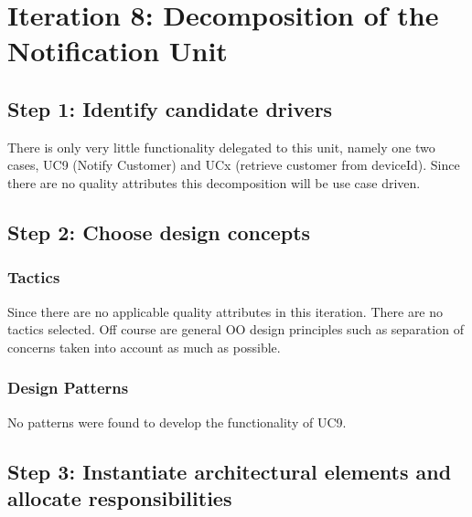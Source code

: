 \section{Iteration 8: Decomposition of the Notification Unit}
\label{add:it8}

\subsection{Step 1: Identify candidate drivers}
\label{add:it8/drivers}

\npar There is only very little functionality delegated to this unit, namely one
two cases, UC9 (Notify Customer) and UCx (retrieve customer from deviceId).
Since there are no quality attributes this decomposition will be use case
driven.

\subsection{Step 2: Choose design concepts}
\label{add:it8/concepts}

\subsubsection{Tactics}
\label{add:it8/tactics}

\npar Since there are no applicable quality attributes in this iteration. There
are no tactics selected. Off course are general OO design principles such as
separation of concerns taken into account as much as possible.

\subsubsection{Design Patterns}
\label{add:it8/patterns}

\npar No patterns were found to develop the functionality of UC9.

\subsection{Step 3: Instantiate architectural elements and allocate responsibilities}
\label{add:it8/elements}

